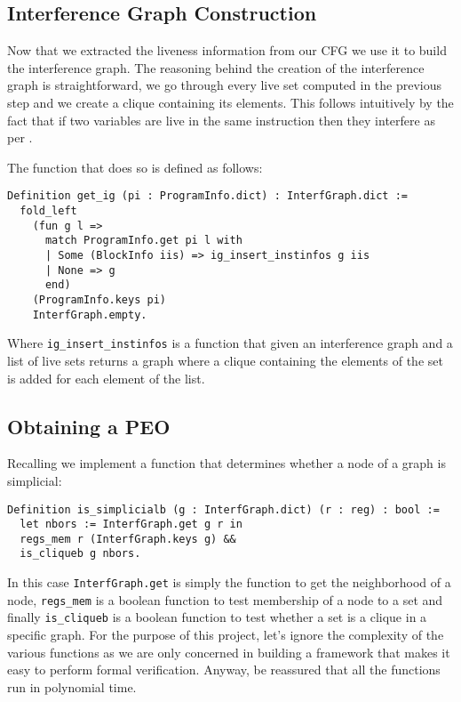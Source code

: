 \subsection{Interference Graph Construction}

Now that we extracted the liveness information from our CFG we use it to build the interference graph.
The reasoning behind the creation of the interference graph is straightforward, we go through every live set computed in the previous step and we create a clique containing its elements. This follows intuitively by the fact that if two variables are live in the same instruction then they interfere as per .

The function that does so is defined as follows:

\begin{lstlisting}[style=Coq]
Definition get_ig (pi : ProgramInfo.dict) : InterfGraph.dict :=
  fold_left
    (fun g l =>
      match ProgramInfo.get pi l with
      | Some (BlockInfo iis) => ig_insert_instinfos g iis
      | None => g
      end)
    (ProgramInfo.keys pi)
    InterfGraph.empty.
\end{lstlisting}

Where \texttt{ig\_insert\_instinfos} is a function that given an interference graph and a list of live sets returns a graph where a clique containing the elements of the set is added for each element of the list.

\subsection{Obtaining a PEO}

Recalling  we implement a function that determines whether a node of a graph is simplicial:

\begin{lstlisting}[style=Coq]
Definition is_simplicialb (g : InterfGraph.dict) (r : reg) : bool :=
  let nbors := InterfGraph.get g r in
  regs_mem r (InterfGraph.keys g) &&
  is_cliqueb g nbors.
\end{lstlisting}

In this case \texttt{InterfGraph.get} is simply the function to get the neighborhood of a node, \texttt{regs\_mem} is a boolean function to test membership of a node to a set and finally \texttt{is\_cliqueb} is a boolean function to test whether a set is a clique in a specific graph.
For the purpose of this project, let's ignore the complexity of the various functions as we are only concerned in building a framework that makes it easy to perform formal verification. Anyway, be reassured that all the functions run in polynomial time.

